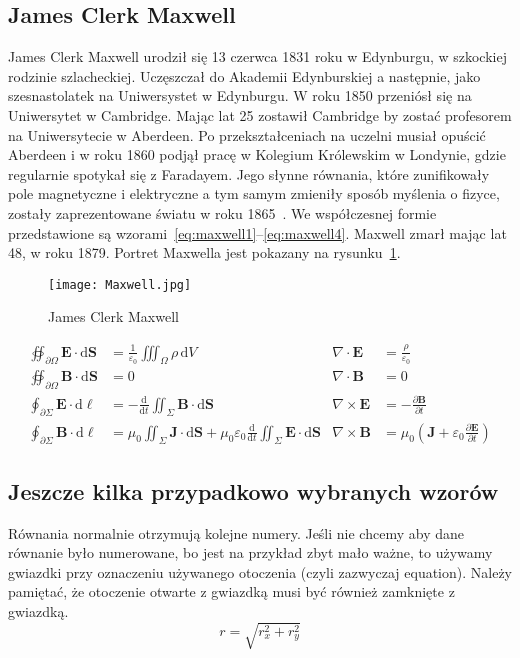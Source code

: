 \subsection{James Clerk Maxwell}
James Clerk Maxwell urodził się 13 czerwca 1831 roku w Edynburgu, w szkockiej rodzinie szlacheckiej. Uczęszczał do Akademii Edynburskiej a następnie, jako szesnastolatek na Uniwersystet w Edynburgu. W roku 1850 przeniósł się na Uniwersytet w Cambridge. Mając lat 25 zostawił Cambridge by zostać profesorem na Uniwersytecie w Aberdeen. Po przekształceniach na uczelni musiał opuścić Aberdeen i w roku 1860 podjął pracę w Kolegium Królewskim w Londynie, gdzie regularnie spotykał się z Faradayem. Jego słynne równania, które zunifikowały pole magnetyczne i elektryczne a tym samym zmieniły sposób myślenia o fizyce, zostały zaprezentowane światu w roku 1865~\cite{maxwell1865}. We współczesnej formie przedstawione są wzorami~\ref{eq:maxwell1}--\ref{eq:maxwell4}. Maxwell zmarł mając lat 48, w roku 1879. Portret Maxwella jest pokazany na rysunku~\ref{rys:maxwell}.

\begin{figure}[!t]
	\centering \texttt{[image: Maxwell.jpg]}
	\caption{James Clerk Maxwell}
	\label{rys:maxwell}
\end{figure}

\begin{align}
\oiint\nolimits_{\partial \Omega} \pmb{E} \cdot \mathrm{d}\pmb{S} &= \frac{1}{\varepsilon_0} \iiint\nolimits_\Omega \rho \, \mathrm{d}V &  \nabla \cdot \pmb{E} &= \frac {\rho} {\varepsilon_0} \label{eq:maxwell1} \\
\oiint\nolimits_{\partial \Omega} \pmb{B} \cdot \mathrm{d}\pmb{S} &= 0 & \nabla \cdot \pmb{B} &= 0 \label{eq:maxwell2} \\
\oint\nolimits_{\partial \Sigma} \pmb{E} \cdot \mathrm{d}\boldsymbol{\ell} &= -\frac{\mathrm{d}}{\mathrm{d}t}\iint\nolimits_{\Sigma}\pmb{B}\cdot\mathrm{d}\pmb{S} & \nabla \times \pmb{E} &= -\frac{\partial \pmb{B}}{\partial t} \label{eq:maxwell3} \\
\oint\nolimits_{\partial \Sigma} \pmb{B} \cdot \mathrm{d}\boldsymbol{\ell} &= \mu_0 \iint\nolimits_{\Sigma} \pmb{J} \cdot \mathrm{d}\pmb{S} + \mu_0 \varepsilon_0 \frac{\mathrm{d}}{\mathrm{d}t} \iint\nolimits_{\Sigma} \pmb{E} \cdot \mathrm{d}\pmb{S} & \nabla \times \pmb{B} &= \mu_0\left(\pmb{J} + \varepsilon_0 \frac{\partial \pmb{E}} {\partial t} \right) \label{eq:maxwell4}
\end{align}


\subsection{Jeszcze kilka przypadkowo wybranych wzorów}
Równania normalnie otrzymują kolejne numery. Jeśli nie chcemy aby dane równanie było numerowane, bo jest na przykład zbyt mało ważne, to używamy gwiazdki przy oznaczeniu używanego otoczenia (czyli zazwyczaj equation). Należy pamiętać, że otoczenie otwarte z gwiazdką musi być również zamknięte z gwiazdką.
\begin{equation*}
    r = \sqrt{r_x^2 + r_y^2}
\end{equation*}

